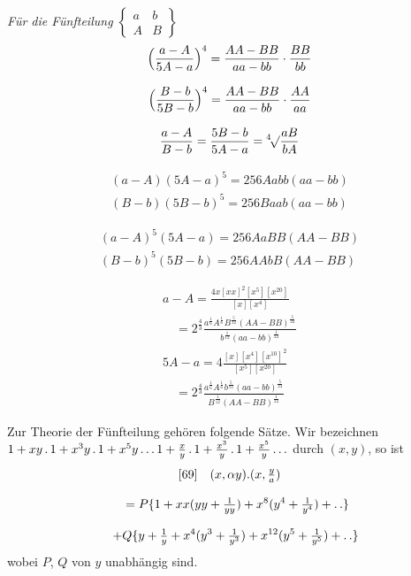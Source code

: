 \begingroup
\renewcommand{\arraystretch}{1.45}

\textit{Für die Fünfteilung}\quad
$\left\{\begin{array}{cc}a&b\\A&B\end{array}\right\}$
\[
\begin{gathered}
\Bigl(\frac{a-A}{5A-a}\Bigr)^4=\frac{AA-BB}{aa-bb}\cdot\frac{BB}{bb}\\[8pt]
\Bigl(\frac{B-b}{5B-b}\Bigr)^4=\frac{AA-BB}{aa-bb}\cdot\frac{AA}{aa}\\[8pt]
\frac{a-A}{B-b}=\frac{5B-b}{5A-a}=\mathord{{}^{4}\!\surd}{\frac{aB}{bA}}
\end{gathered}
\]

\[
\begin{gathered}
(a-A)(5A-a)^5=256Aabb(aa-bb)\\[8pt]
(B-b)(5B-b)^5=256Baab(aa-bb)
\end{gathered}
\]

\[
\begin{gathered}
(a-A)^5(5A-a)=256AaBB(AA-BB)\\[8pt]
(B-b)^5(5B-b)=256AAbB(AA-BB)
\end{gathered}
\]

\[
\begin{gathered}
a-A=\frac{4x[xx]^2[x^5][x^{20}]}{[x][x^4]}
 \\[8pt]\quad{}=2^{\frac43}\frac{a^{\frac16}A^{\frac16}B^{\frac5{12}}(AA-BB)^{\frac5{24}}}
 {b^{\frac1{12}}(aa-bb)^{\frac1{24}}}\\[1ex]
5A-a=4\frac{[x][x^4][x^{10}]^2}{[x^5][x^{20}]}
 \\[8pt]\quad{}=2^{\frac43}\frac{a^{\frac16}A^{\frac16}b^{\frac5{12}}(aa-bb)^{\frac5{24}}}
 {B^{\frac1{12}}(AA-BB)^{\frac1{24}}}
\end{gathered}
\]



Zur Theorie der Fünfteilung gehören folgende Sätze. Wir bezeichnen
$1+xy\,.\,1+x^3y\,.\,1+x^5y\mathinner{.\,.\,.}1+\frac xy\,.\,1+\frac{x^3}y\,.\,1+\frac{x^5}y\mathinner{.\,.\,.}$
durch $(x,y)$, so ist
\[
\begin{gathered}
[69]\quad{}
(x,\alpha y).(x,\tfrac ya)
\\[8pt]\quad{}=P\{1+xx(yy+\tfrac1{yy})+x^8(y^4+\tfrac1{y^4})+\mathinner{.\,.}\}\\[8pt]
\quad+Q\{y+\tfrac1y+x^4(y^3+\tfrac1{y^3})+x^{12}(y^5+\tfrac1{y^5})+\mathinner{.\,.}\}
\end{gathered}
\]
wobei $P$, $Q$ von $y$ unabhängig sind.

